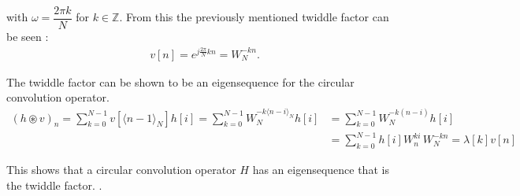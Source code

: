 with $\omega = \dfrac{2 \pi k}{N}$ for $k \in \mathbb{Z}$. From this the previously mentioned twiddle factor can be seen \cite{FSP}:
\begin{align*}
v[n] = e^{j\frac{2\pi}{N} kn} = W_N^{-kn}.
\end{align*}

The twiddle factor can be shown to be an eigensequence for the circular convolution operator.
\begin{align*}
	(h\circledast v)_n 
	= \sum_{k=0}^{N-1} v[\langle n-1\rangle_N	]h[i] 
	= \sum_{k=0}^{N-1} W_N^{-k\langle n-i\rangle_N}h[i]
	&= \sum_{k=0}^{N-1} W_N^{-k(n-i)}h[i]\\
	&= \sum_{k=0}^{N-1} h[i] W_n^{ki} \, W_N^{-kn}
	= \lambda[k] v[n]
\end{align*}

This shows that a circular convolution operator $H$ has an eigensequence that is the twiddle factor. .